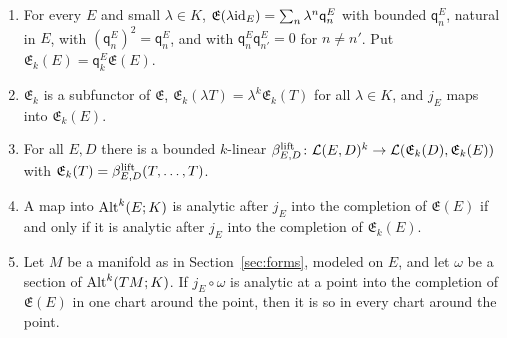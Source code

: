 \begin{lemma}\label{amb:lem:homogeneous}
\leavevmode
\begin{enumerate}
\item For every $E$ and small $\lambda\in K$, $\mathfrak E(\lambda\mathrm{id}_E)=\sum_n\lambda^n\mathsf q_n^E$ with bounded $\mathsf q_n^E$, natural in $E$, with $(\mathsf q_n^E)^2=\mathsf q_n^E$, and with $\mathsf q_n^E\mathsf q_{n'}^E=0$ for $n\ne n'$. Put $\mathfrak E_k(E)=\mathsf q_k^E\mathfrak E(E)$.
\item $\mathfrak E_k$ is a subfunctor of $\mathfrak E$, $\mathfrak E_k(\lambda T)=\lambda^k\mathfrak E_k(T)$ for all $\lambda\in K$, and $j_E$ maps into $\mathfrak E_k(E)$.
\item For all $E,D$ there is a bounded $k$-linear $\beta^{\rm lift}_{E,D}\colon\mathcal L(E,D)^k\to\mathcal L(\mathfrak E_k(D),\mathfrak E_k(E))$ with $\mathfrak E_k(T)=\beta^{\rm lift}_{E,D}(T,\dots,T)$.
\item A map into $\operatorname{Alt}^k(E;K)$ is analytic after $j_E$ into the completion of $\mathfrak E(E)$ if and only if it is analytic after $j_E$ into the completion of $\mathfrak E_k(E)$.
\item Let $M$ be a manifold as in Section~\ref{sec:forms}, modeled on $E$, and let $\omega$ be a section of $\operatorname{Alt}^k(TM;K)$. If $j_E\circ\omega$ is analytic at a point into the completion of $\mathfrak E(E)$ in one chart around the point, then it is so in every chart around the point.
\end{enumerate}
\end{lemma}

